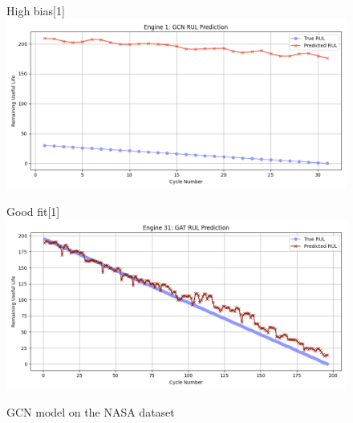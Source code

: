 \documentclass[12pt]{article}
\begin{document}
\begin{figure}[H]
\begin{minipage}[t]{0.48\textwidth}
        \vspace{0.1cm}

        \begin{subcaptionbox}{High bias\label{fig_NASA_GCN_eng3}}[1\linewidth]
            {\includegraphics[width=\linewidth]{figures/NASA/NASA_GCN_eng1.png}}
        \end{subcaptionbox}

        \caption*{GCN model on the NASA dataset}
    \end{minipage}
    \hfill
    \begin{minipage}[t]{0.48\textwidth}
        \centering
        \begin{subcaptionbox}{Good fit\label{fig_NASA_GAT_eng6}}[1\linewidth]
            {\includegraphics[width=\linewidth]{figures/NASA/NASA_GAT_eng7.png}}
        \end{subcaptionbox}

        \vspace{0.1cm}


\end{minipage}
\end{figure}
\end{document}
